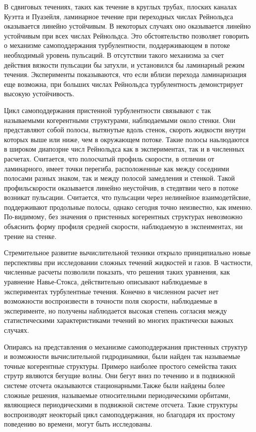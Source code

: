 В сдвиговых течениях, таких как течение в круглых трубах, плоских каналах Куэтта и Пуазейля, ламинарное течение при переходных числах Рейнольдса оказывается линейно устойчивым. В некоторых случаях оно оказывается линейно устойчивым при всех числах Рейнольдса. Это обстоятельство позволяет говорить о механизме самоподдержания турбулентности, поддерживающем в потоке необходимый уровень пульсаций. В отсутствии такого механизма за счет действия вязкости пульсации бы затухли, и установился бы ламинарный режим течения. Эксперименты показываются, что если вблизи перехода ламинаризация еще возможна, при больших числах Рейнольдса турбулентность демонстрирует высокую устойчивость. 


Цикл самоподдержания пристенной турбулентности связывают с так называемыми когерентными структурами, наблюдаемыми около стенки. Они представляют собой полосы, вытянутые вдоль стенок, скороть жидкости внутри которых выше или ниже, чем в окружающем потоке. Такие полосы наьлюдаются в широком диапозрне числ Рейнольдса как в экспериментах, так и в численных расчетах. Считается, что полосчатый профиль скорости, в отличии от ламинарного, имеет точки перегиба, расположенные как между соседними полосами разных знаком, так и между полосой замедления и стенкой. Такой профильскорости оказывается линейно неустойчив, в стедвтвии чего в потоке возникат пульсации. Считается, что пульсации через нелинейное взаимодетйсвие, поддерживают продольные полосы, однако сегодня точно неизвестно, как именно. По-видимому, без значения о пристенных когерентных структурах невозможно объяснить форму профиля средней скорости, наблюдаемую в экспеиментах, ни трение на стенке. 



Стремительное развитие вычислительной техники открыло принципиально новые перспективы при исследовании сложных течений жидкостей и газов. В частности, численные расчеты позволили показать, что решения таких уравнения, как уравнение Навье-Стокса, действительно описывают наблюдаемые в экспериментах турбулентные течения. Конечно в численном расчет нет возможности воспроизвести в точности поля скорости, наблюдаемые в эксперименте, но получены наблюдается высокая степень согласия между статистическими характеристиками течений во многих практически важных случаях. 


Опираясь на представления о механизме самоподдержания пристенных структур и возможности вычислительной гидродинамики, были найден так называемые точные когерентные структуры. Примеро наиболее простого семейства таких струтр являются бегущие волны. Они бегут вниз по течению и в подвижной системе отсчета оказываются стационарными.Также были найдены более сложные решения, называемые относителными периодическими орбитами, являющиеся периодическими в подвижной системе отсчета. Такие структуры воспроизводят неокторый цикл самоподдержания, но благодаря их простому поведению во времени, могут быть исследованы. 


